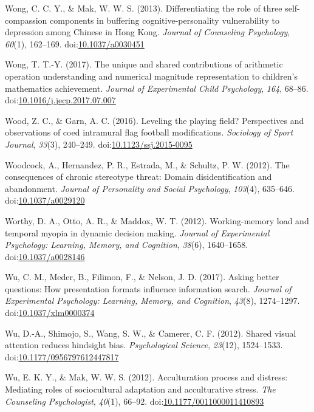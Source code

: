 \documentclass[english,man]{apa6}
\theoremstyle{definition}
\theoremstyle{definition}
\theoremstyle{definition}
\theoremstyle{remark}
\begin{document}
\hypertarget{ref-Wong2013}{}
Wong, C. C. Y., \& Mak, W. W. S. (2013). Differentiating the role of
three self-compassion components in buffering cognitive-personality
vulnerability to depression among Chinese in Hong Kong. \emph{Journal of
Counseling Psychology}, \emph{60}(1), 162--169.
doi:\href{https://doi.org/10.1037/a0030451}{10.1037/a0030451}

\hypertarget{ref-Wong2017}{}
Wong, T. T.-Y. (2017). The unique and shared contributions of arithmetic
operation understanding and numerical magnitude representation to
children's mathematics achievement. \emph{Journal of Experimental Child
Psychology}, \emph{164}, 68--86.
doi:\href{https://doi.org/10.1016/j.jecp.2017.07.007}{10.1016/j.jecp.2017.07.007}

\hypertarget{ref-Wood2016}{}
Wood, Z. C., \& Garn, A. C. (2016). Leveling the playing field?
Perspectives and observations of coed intramural flag football
modifications. \emph{Sociology of Sport Journal}, \emph{33}(3),
240--249.
doi:\href{https://doi.org/10.1123/ssj.2015-0095}{10.1123/ssj.2015-0095}

\hypertarget{ref-Woodcock}{}
Woodcock, A., Hernandez, P. R., Estrada, M., \& Schultz, P. W. (2012).
The consequences of chronic stereotype threat: Domain disidentification
and abandonment. \emph{Journal of Personality and Social Psychology},
\emph{103}(4), 635--646.
doi:\href{https://doi.org/10.1037/a0029120}{10.1037/a0029120}

\hypertarget{ref-Worthy2012}{}
Worthy, D. A., Otto, A. R., \& Maddox, W. T. (2012). Working-memory load
and temporal myopia in dynamic decision making. \emph{Journal of
Experimental Psychology: Learning, Memory, and Cognition}, \emph{38}(6),
1640--1658.
doi:\href{https://doi.org/10.1037/a0028146}{10.1037/a0028146}

\hypertarget{ref-Wu2016}{}
Wu, C. M., Meder, B., Filimon, F., \& Nelson, J. D. (2017). Asking
better questions: How presentation formats influence information search.
\emph{Journal of Experimental Psychology: Learning, Memory, and
Cognition}, \emph{43}(8), 1274--1297.
doi:\href{https://doi.org/10.1037/xlm0000374}{10.1037/xlm0000374}

\hypertarget{ref-Wu2012a}{}
Wu, D.-A., Shimojo, S., Wang, S. W., \& Camerer, C. F. (2012). Shared
visual attention reduces hindsight bias. \emph{Psychological Science},
\emph{23}(12), 1524--1533.
doi:\href{https://doi.org/10.1177/0956797612447817}{10.1177/0956797612447817}

\hypertarget{ref-Wu2012}{}
Wu, E. K. Y., \& Mak, W. W. S. (2012). Acculturation process and
distress: Mediating roles of sociocultural adaptation and acculturative
stress. \emph{The Counseling Psychologist}, \emph{40}(1), 66--92.
doi:\href{https://doi.org/10.1177/0011000011410893}{10.1177/0011000011410893}
\end{document}
